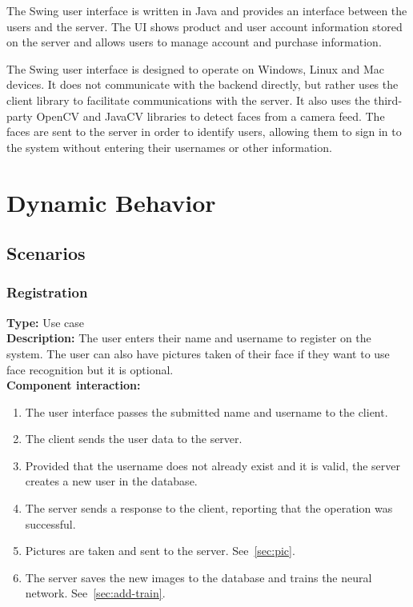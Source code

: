 \documentclass[11pt]{article}
\begin{document}
The Swing user interface is written in Java and provides an interface
between the users and the server. The UI shows product and user account
information stored on the server and allows users to manage account
and purchase information.

The Swing user interface is designed to operate on Windows, Linux and
Mac devices. It does not communicate with the backend directly, but rather
uses the client library to facilitate communications with the server.
It also uses the third-party OpenCV and JavaCV libraries to detect faces
from a camera feed. The faces are sent to the server in order to identify
users, allowing them to sign in to the system without entering their
usernames or other information.


\section{Dynamic Behavior}
\subsection{Scenarios}

\subsubsection{Registration}
\textbf{Type:} Use case\\
\textbf{Description:} The user enters their name and username to register on the system. 
The user can also have pictures taken of their face if they want to use face recognition but it is optional.\\
\textbf{Component interaction:} 
\begin{enumerate} 
\item{The user interface passes the submitted name and username to the client.}
\item{The client sends the user data to the server.}
\item{Provided that the username does not already exist and it is valid, the server creates a new user in the database.}
\item{The server sends a response to the client, reporting that the operation was successful.}
\item{Pictures are taken and sent to the server. See~\ref{sec:pic}.}
\item{The server saves the new images to the database and trains the neural network. See~\ref{sec:add-train}.}
\end{enumerate}
\end{document}
